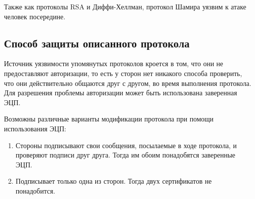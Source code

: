 
Также как протоколы RSA и Диффи-Хеллман, протокол Шамира уязвим к атаке человек посередине. 
\subsection{Способ защиты описанного протокола}
Источник уязвимости упомянутых протоколов кроется в том, что они не предоставляют авторизации, то есть у сторон нет никакого способа проверить, что они действительно общаются друг с другом, во время выполнения протокола. Для разрешения проблемы авторизации может быть использована заверенная ЭЦП.

Возможны различные варианты модификации протокола при помощи использования ЭЦП:
\begin{enumerate}
	\item Стороны  подписывают свои сообщения, посылаемые в ходе протокола, и проверяют подписи друг друга. Тогда им обоим понадобятся заверенные ЭЦП. 
	\item Подписывает только одна из сторон. Тогда двух сертификатов не понадобится.
\end{enumerate} 

